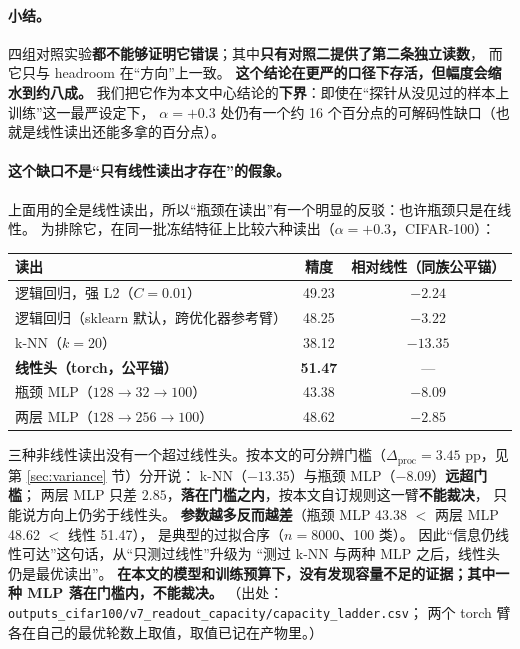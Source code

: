 \documentclass[11pt,a4paper]{ctexart}
\begin{document}
\paragraph{小结。}
四组对照实验\textbf{都不能够证明它错误}；其中\textbf{只有对照二提供了第二条独立读数}，
而它只与 headroom 在“方向”上一致。
\textbf{这个结论在更严的口径下存活，但幅度会缩水到约八成。}
我们把它作为本文中心结论的\textbf{下界}：即使在“探针从没见过的样本上训练”这一最严设定下，
$\alpha=+0.3$ 处仍有一个约 16 个百分点的可解码性缺口（也就是线性读出还能多拿的百分点）。

\paragraph{这个缺口不是“只有线性读出才存在”的假象。}
上面用的全是线性读出，所以“瓶颈在读出”有一个明显的反驳：也许瓶颈只是在线性。
为排除它，在同一批冻结特征上比较六种读出（$\alpha=+0.3$，CIFAR-100）：

\begin{center}
\small
\begin{tabular}{lcc}
\toprule
读出 & 精度 & 相对线性（同族公平锚） \\
\midrule
逻辑回归，强 L2（$C=0.01$） & 49.23 & $-2.24$ \\
逻辑回归（sklearn 默认，跨优化器参考臂） & 48.25 & $-3.22$ \\
k-NN（$k=20$） & 38.12 & $-13.35$ \\
\textbf{线性头（torch，公平锚）} & \textbf{51.47} & --- \\
瓶颈 MLP（$128\to32\to100$） & 43.38 & $-8.09$ \\
两层 MLP（$128\to256\to100$） & 48.62 & $-2.85$ \\
\bottomrule
\end{tabular}
\end{center}

三种非线性读出没有一个超过线性头。按本文的可分辨门槛（$\Delta_{\text{proc}}=3.45$ pp，见第 \ref{sec:variance} 节）分开说：
k-NN（$-13.35$）与瓶颈 MLP（$-8.09$）\textbf{远超门槛}；
两层 MLP 只差 $2.85$，\textbf{落在门槛之内}，按本文自订规则这一臂\textbf{不能裁决}，
只能说方向上仍劣于线性头。
\textbf{参数越多反而越差}（瓶颈 MLP 43.38 $<$ 两层 MLP 48.62 $<$ 线性 51.47），
是典型的过拟合序（$n=8000$、100 类）。
因此“信息仍线性可达”这句话，从“只测过线性”升级为
“测过 k-NN 与两种 MLP 之后，线性头仍是最优读出”。
\textbf{在本文的模型和训练预算下，没有发现容量不足的证据；其中一种 MLP 落在门槛内，不能裁决。}
（出处：\texttt{outputs\_cifar100/v7\_readout\_capacity/capacity\_ladder.csv}；
两个 torch 臂各在自己的最优轮数上取值，取值已记在产物里。）
\end{document}
